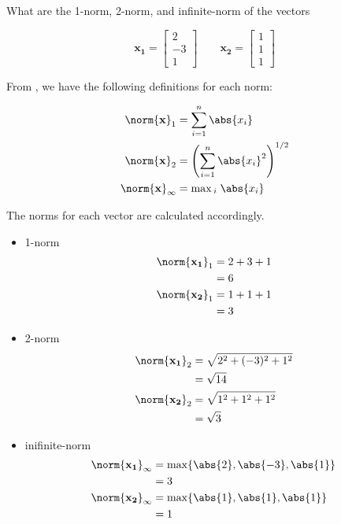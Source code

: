 \item [3.2] What are the 1-norm, 2-norm, and infinite-norm of the vectors

\begin{equation*}
 \mathbf{x_1} = \begin{bmatrix}
      2\\
      -3\\
      1
     \end{bmatrix}
\qquad
\mathbf{x_2} = \begin{bmatrix}
      1\\
      1\\
      1
     \end{bmatrix}
\end{equation*}

From \cite{chen1999linear}, we have the
following definitions for each norm:

\begin{align*}
\norm{\mathbf{x}}_1 &= \sum_{i=1}^n \abs{x_i}\\
\norm{\mathbf{x}}_2 &= \left ( \sum_{i=1}^n \abs{x_i}^2 \right)^{1/2}\\
\norm{\mathbf{x}}_\infty &= \max{}_i \; \abs{x_i}\\
\end{align*}

The norms for each vector are calculated accordingly.
\begin{itemize}
 \item 1-norm
 \begin{align*}
 \norm{\mathbf{x_1}}_1 &= 2 + 3 +1\\
 &= 6\\
 \norm{\mathbf{x_2}}_1 &= 1+1+1\\
 &= 3\\
\end{align*}
 \item 2-norm
 \begin{align*}
\norm{\mathbf{x_1}}_2 &= \sqrt{2^2 + (-3)^2 + 1^2}\\
&= \sqrt{14} \\
\norm{\mathbf{x_2}}_2 &= \sqrt{1^2 + 1^2 + 1^2}\\
&= \sqrt{3} \\
 \end{align*}

 \item inifinite-norm
 \begin{align*}
  \norm{\mathbf{x_1}}_\infty &= \max \{ \abs{2}, \abs{-3}, \abs{1} \}\\
  &= 3\\
  \norm{\mathbf{x_2}}_\infty &= \max \{ \abs{1}, \abs{1}, \abs{1}\}\\
  &= 1\\
 \end{align*}

\end{itemize}


